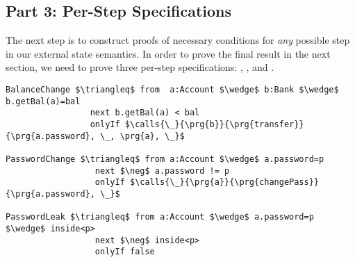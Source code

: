 \subsection{Part 3: Per-Step \Nec Specifications}
The next step is to construct proofs of necessary conditions for
\emph{any} possible step in our external state semantics.
In order to prove the final result in the next section,
we need to prove three per-step \Nec specifications: , , and .
\begin{lstlisting}[language=Chainmail, mathescape=true, frame=lines]
BalanceChange $\triangleq$ from  a:Account $\wedge$ b:Bank $\wedge$ b.getBal(a)=bal
                 next b.getBal(a) < bal
                 onlyIf $\calls{\_}{\prg{b}}{\prg{transfer}}{\prg{a.password}, \_, \prg{a}, \_}$
                 
PasswordChange $\triangleq$ from a:Account $\wedge$ a.password=p
                  next $\neg$ a.password != p
                  onlyIf $\calls{\_}{\prg{a}}{\prg{changePass}}{\prg{a.password}, \_}$
                  
PasswordLeak $\triangleq$ from a:Account $\wedge$ a.password=p $\wedge$ inside<p>
                  next $\neg$ inside<p>
                  onlyIf false
\end{lstlisting}
%
